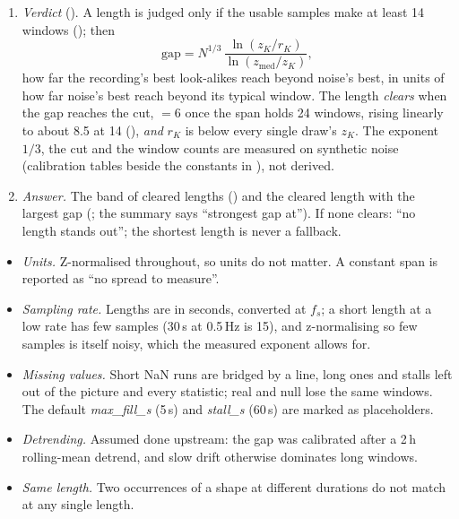 \begin{enumerate}
  so the spectrum is roughly kept and every shape destroyed;
   in ); \texttt{phase} keeps the
  spectrum exactly but makes the values bell-shaped, and is kept for comparison only. Each draw is
  seeded by (\emph{seed}, draw number), so every length sees the same copies, and the long gaps are
  put back. From each draw's distinct windows: $z_K$ (mean of the best 3) and $z_{\mathrm{med}}$
  (the median), averaged over draws.
\item \emph{Verdict} (). A length is judged only if the usable samples make at
  least 14 windows (); then
  \[ \mathrm{gap} = N^{1/3}\,\frac{\ln(z_K / r_K)}{\ln(z_{\mathrm{med}} / z_K)}, \]
  how far the recording's best look-alikes reach beyond noise's best, in units of how far noise's
  best reach beyond its typical window. The length \emph{clears} when the gap reaches the cut,
   $= 6$ once the span holds 24 windows, rising linearly to about 8.5 at 14
  (), \emph{and} $r_K$ is below every single draw's $z_K$. The exponent $1/3$, the
  cut and the window counts are measured on synthetic noise (calibration tables beside the
  constants in ), not derived.
\item \emph{Answer.} The band of cleared lengths () and the cleared length with the
  largest gap (; the summary says ``strongest gap at''). If none clears:
  ``no length stands out''; the shortest length is never a fallback.
\end{enumerate}

\begin{itemize}
\item \emph{Units.} Z-normalised throughout, so units do not matter. A constant span is reported as
  ``no spread to measure''.
\item \emph{Sampling rate.} Lengths are in seconds, converted at $f_s$; a short length at a low rate
  has few samples (30\,s at 0.5\,Hz is 15), and z-normalising so few samples is itself noisy, which
  the measured exponent allows for.
\item \emph{Missing values.} Short NaN runs are bridged by a line, long ones and stalls left out of
  the picture and every statistic; real and null lose the same windows. The default
  \emph{max\_fill\_s} (5\,s) and \emph{stall\_s} (60\,s) are marked as placeholders.
\item \emph{Detrending.} Assumed done upstream: the gap was calibrated after a 2\,h rolling-mean
  detrend, and slow drift otherwise dominates long windows.
\item \emph{Same length.} Two occurrences of a shape at different durations do not match at any
  single length.
\end{itemize}

